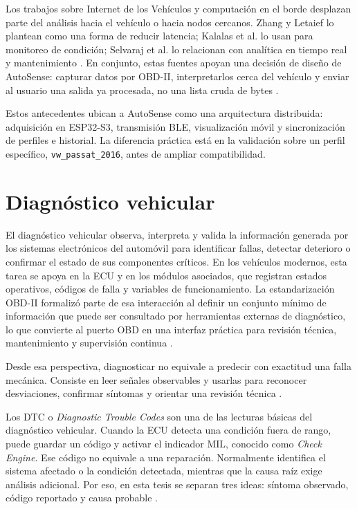 \documentclass[12pt,letterpaper]{report}
\begin{document}
Los trabajos sobre Internet de los Vehículos y computación en el borde desplazan parte del análisis hacia el vehículo o hacia nodos cercanos. Zhang y Letaief lo plantean como una forma de reducir latencia; Kalalas et al. lo usan para monitoreo de condición; Selvaraj et al. lo relacionan con analítica en tiempo real y mantenimiento \cite{zhang2020_iov_edge,kalalas2025_ai_driven_monitoring,selvaraj2023_advanced_telematics}. En conjunto, estas fuentes apoyan una decisión de diseño de AutoSense: capturar datos por OBD-II, interpretarlos cerca del vehículo y enviar al usuario una salida ya procesada, no una lista cruda de bytes \cite{michailidis2025_obdii_review,tormos2025_explainable_ai}.

Estos antecedentes ubican a AutoSense como una arquitectura distribuida: adquisición en ESP32-S3, transmisión BLE, visualización móvil y sincronización de perfiles e historial. La diferencia práctica está en la validación sobre un perfil específico, \texttt{vw\_passat\_2016}, antes de ampliar compatibilidad.

\section{Diagnóstico vehicular}
\label{sec:diagnostico-vehicular}

El diagnóstico vehicular observa, interpreta y valida la información generada por los sistemas electrónicos del automóvil para identificar fallas, detectar deterioro o confirmar el estado de sus componentes críticos. En los vehículos modernos, esta tarea se apoya en la ECU y en los módulos asociados, que registran estados operativos, códigos de falla y variables de funcionamiento. La estandarización OBD-II formalizó parte de esa interacción al definir un conjunto mínimo de información que puede ser consultado por herramientas externas de diagnóstico, lo que convierte al puerto OBD en una interfaz práctica para revisión técnica, mantenimiento y supervisión continua \cite{sae2022_j1978_obdii_scan_tool,epa2016_obd_information_exchange}.

Desde esa perspectiva, diagnosticar no equivale a predecir con exactitud una falla mecánica. Consiste en leer señales observables y usarlas para reconocer desviaciones, confirmar síntomas y orientar una revisión técnica \cite{sae2022_j1978_obdii_scan_tool,epa2016_obd_information_exchange}.

Los DTC o \textit{Diagnostic Trouble Codes} son una de las lecturas básicas del diagnóstico vehicular. Cuando la ECU detecta una condición fuera de rango, puede guardar un código y activar el indicador MIL, conocido como \textit{Check Engine}. Ese código no equivale a una reparación. Normalmente identifica el sistema afectado o la condición detectada, mientras que la causa raíz exige análisis adicional. Por eso, en esta tesis se separan tres ideas: síntoma observado, código reportado y causa probable \cite{epa2016_obd_information_exchange}.
\end{document}
